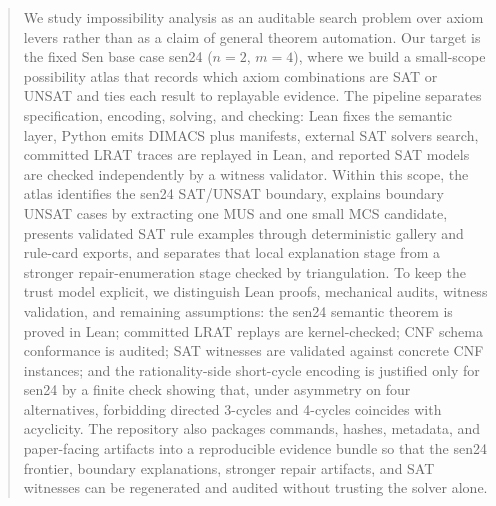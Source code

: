 \begin{abstract}
We study impossibility analysis as an auditable search problem over axiom levers rather than as a claim of general theorem automation.
Our target is the fixed Sen base case sen24 ($n=2$, $m=4$), where we build a small-scope possibility atlas that records which axiom combinations are SAT or UNSAT and ties each result to replayable evidence.
The pipeline separates specification, encoding, solving, and checking: Lean fixes the semantic layer, Python emits DIMACS plus manifests, external SAT solvers search, committed LRAT traces are replayed in Lean, and reported SAT models are checked independently by a witness validator.
Within this scope, the atlas identifies the sen24 SAT/UNSAT boundary, explains boundary UNSAT cases by extracting one MUS and one small MCS candidate, presents validated SAT rule examples through deterministic gallery and rule-card exports, and separates that local explanation stage from a stronger repair-enumeration stage checked by triangulation.
To keep the trust model explicit, we distinguish Lean proofs, mechanical audits, witness validation, and remaining assumptions: the sen24 semantic theorem is proved in Lean; committed LRAT replays are kernel-checked; CNF schema conformance is audited; SAT witnesses are validated against concrete CNF instances; and the rationality-side short-cycle encoding is justified only for sen24 by a finite check showing that, under asymmetry on four alternatives, forbidding directed 3-cycles and 4-cycles coincides with acyclicity.
The repository also packages commands, hashes, metadata, and paper-facing artifacts into a reproducible evidence bundle so that the sen24 frontier, boundary explanations, stronger repair artifacts, and SAT witnesses can be regenerated and audited without trusting the solver alone.
\end{abstract}
